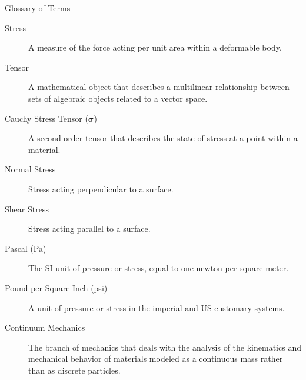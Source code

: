 \documentclass{beamer}
\begin{document}
\begin{frame}{Glossary of Terms}
  \begin{description}
    \item[Stress] A measure of the force acting per unit area within a deformable body.
    \item[Tensor] A mathematical object that describes a multilinear relationship between sets of algebraic objects related to a vector space.
    \item[Cauchy Stress Tensor ($\boldsymbol{\sigma}$)] A second-order tensor that describes the state of stress at a point within a material.
    \item[Normal Stress] Stress acting perpendicular to a surface.
    \item[Shear Stress] Stress acting parallel to a surface.
    \item[Pascal (Pa)] The SI unit of pressure or stress, equal to one newton per square meter.
    \item[Pound per Square Inch (psi)] A unit of pressure or stress in the imperial and US customary systems.
    \item[Continuum Mechanics] The branch of mechanics that deals with the analysis of the kinematics and mechanical behavior of materials modeled as a continuous mass rather than as discrete particles.
  \end{description}
\end{frame}
\end{document}
